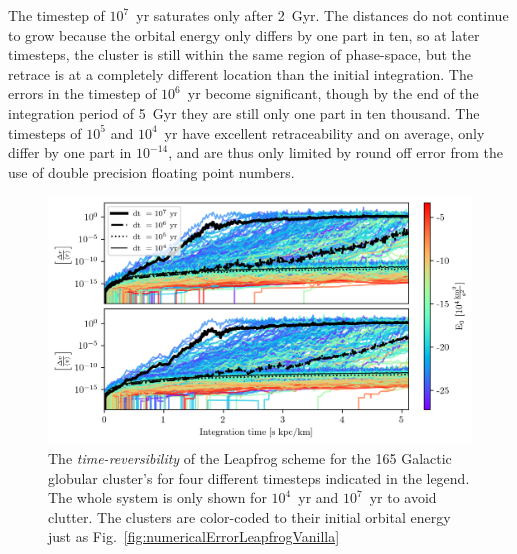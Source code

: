         The timestep of $10^7$~yr saturates only after 2~Gyr. The distances do not continue to grow because the orbital energy only differs by one part in ten, so at later timesteps, the cluster is still within the same region of phase-space, but the retrace is at a completely different location than the initial integration. The errors in the timestep of $10^6$~yr become significant, though by the end of the integration period of 5~Gyr they are still only one part in ten thousand. The timesteps of $10^5$ and $10^4$~yr have excellent retraceability and on average, only differ by one part in $10^{-14}$, and are thus only limited by round off error from the use of double precision floating point numbers.
        \begin{figure}
            \centering
            \includegraphics[width=\linewidth]{images/numericalErrorReverseIntegration.png}
            \caption[Time-reversibility of the globular cluster system]{The \textit{time-reversibility} of the Leapfrog scheme for the 165 Galactic globular cluster's for four different timesteps indicated in the legend. The whole system is only shown for $10^4$~yr and $10^7$~yr to avoid clutter. The clusters are color-coded to their initial orbital energy just as Fig.~\ref{fig:numericalErrorLeapfrogVanilla}}
            \label{fig:numericalErrorReverseIntegration}
        \end{figure}

